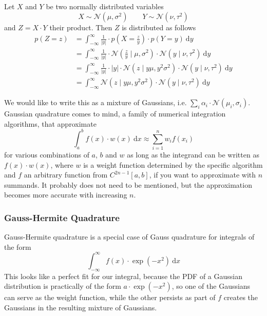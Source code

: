 \documentclass[11pt,a4paper]{book}
\begin{document}
Let $X$ and $Y$ be two normally distributed variables
\begin{equation*}
  X \sim \mathcal{N}(\mu, \sigma^{2}) \qquad Y \sim \mathcal{N}(\nu, \tau^{2})
\end{equation*}
and $Z = X \cdot Y$ their product. Then $Z$ is distributed as follows
\begin{align*}
  p(Z = z) & = \int_{-\infty}^{\infty} \frac{1}{|y|} \cdot p\left(X = \frac{z}{y}\right) \cdot p(Y = y)~\mathrm{d}y\\
           & = \int_{-\infty}^{\infty} \frac{1}{|y|} \cdot \mathcal{N}\left( \frac{z}{y} \mid \mu, \sigma^{2} \right) \cdot \mathcal{N}(y \mid \nu, \tau^{2})~\mathrm{d}y\\
           & = \int_{-\infty}^{\infty} \frac{1}{|y|} \cdot |y| \cdot \mathcal{N}\left( z \mid y\mu, y^{2}\sigma^{2} \right) \cdot \mathcal{N}(y \mid \nu, \tau^{2})~\mathrm{d}y\\
           & = \int_{-\infty}^{\infty} \mathcal{N}\left( z \mid y\mu, y^{2}\sigma^{2} \right) \cdot \mathcal{N}(y \mid \nu, \tau^{2})~\mathrm{d}y
\end{align*}

We would like to write this as a mixture of Gaussians, i.e.
$\sum_{i} \alpha_{i} \cdot \mathcal{N}(\mu_{i}, \sigma_{i})$. Gaussian
quadrature comes to mind, a family of numerical integration algorithms, that
approximate
\begin{equation*}
  \int_{a}^{b} f(x) \cdot w(x)~\mathrm{d}x \approx \sum_{i = 1}^{n} w_{i} f(x_{i})
\end{equation*}
for various combinations of $a$, $b$ and $w$ as long as the integrand can be
written as $f(x) \cdot w(x)$, where $w$ is a weight function determined by the
specific algorithm and $f$ an arbitrary function from $C^{2n - 1}[a, b]$, if you
want to approximate with $n$ summands. It probably does not need to be
mentioned, but the approximation becomes more accurate with increasing $n$.

\subsubsection{Gauss-Hermite Quadrature}

Gauss-Hermite quadrature is a special case of Gauss quadrature for integrals of
the form
\begin{equation*}
  \int_{-\infty}^{\infty} f(x) \cdot \exp(-x^{2})~\mathrm{d}x
\end{equation*}
This looks like a perfect fit for our integral, because the PDF of a Gaussian
distribution is practically of the form $a \cdot \exp(-x^{2})$, so one of the
Gaussians can serve as the weight function, while the other persists as part of
$f$ creates the Gaussians in the resulting mixture of Gaussians.
\end{document}
